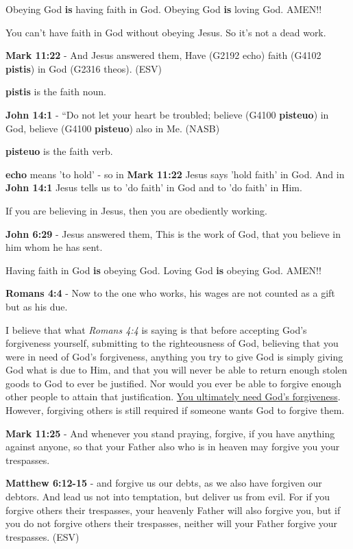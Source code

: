 \documentclass[11pt]{article}
\begin{document}
Obeying God \textbf{is} having faith in God. Obeying God \textbf{is} loving God. AMEN!!

You can't have faith in God without obeying Jesus. So it's not a dead work.

\textbf{Mark 11:22} - And Jesus answered them, Have (G2192 echo) faith (G4102 \textbf{pistis}) in God (G2316 theos). (ESV)

\textbf{pistis} is the faith noun.

\textbf{John 14:1} - “Do not let your heart be troubled; believe (G4100 \textbf{pisteuo}) in God, believe (G4100 \textbf{pisteuo}) also in Me. (NASB)

\textbf{pisteuo} is the faith verb.

\textbf{echo} means 'to hold' - so in \textbf{Mark 11:22} Jesus says 'hold faith' in God.
And in \textbf{John 14:1} Jesus tells us to 'do faith' in God and to 'do faith' in Him.

If you are believing in Jesus, then you are obediently working.

\textbf{John 6:29} - Jesus answered them, This is the work of God, that you believe in him whom he has sent.

Having faith in God \textbf{is} obeying God. Loving God \textbf{is} obeying God. AMEN!!

\textbf{Romans 4:4} - Now to the one who works, his wages are not counted as a gift but as his due.

I believe that what \emph{Romans 4:4} is saying is that before accepting God's forgiveness yourself, submitting to the righteousness of God, believing that you were in need of God's forgiveness,
anything you try to give God is simply giving God what is due to Him, and that you will never be able to return enough stolen goods to God to ever be justified. Nor would you ever be able to forgive enough other people to attain that justification.
\uline{You ultimately need God's forgiveness}. However, forgiving others is still required if someone wants God to forgive them.

\textbf{Mark 11:25} - And whenever you stand praying, forgive, if you have anything against anyone, so that your Father also who is in heaven may forgive you your trespasses.

\textbf{Matthew 6:12-15} -  and forgive us our debts, as we also have forgiven our debtors.  And lead us not into temptation, but deliver us from evil.  For if you forgive others their trespasses, your heavenly Father will also forgive you, but if you do not forgive others their trespasses, neither will your Father forgive your trespasses.  (ESV)
\end{document}
